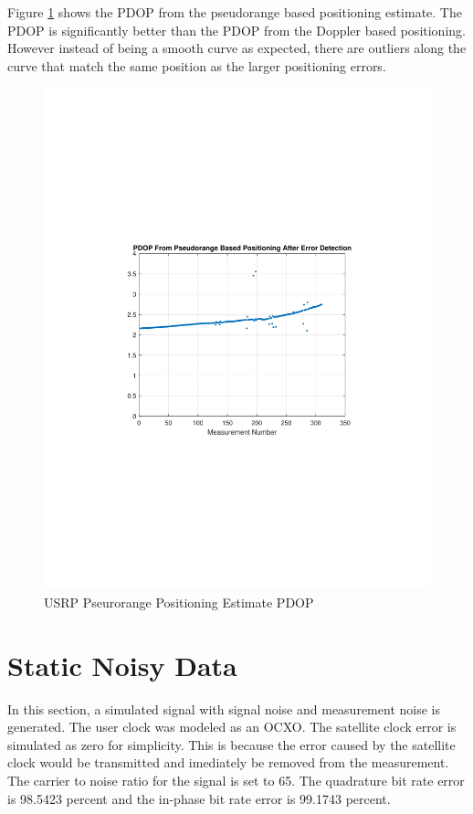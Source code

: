 \documentclass[12pt]{report}
\begin{document}
Figure \ref{fig:USRPpseudo15minIridPositpdop} shows the PDOP from the pseudorange based positioning estimate. The PDOP is significantly better than the PDOP from the Doppler based positioning. However instead of being a smooth curve as expected, there are outliers along the curve that match the same position as the larger positioning errors. 
\begin{figure}[h!]
    \centering
    \includegraphics[trim=1.2in 3.3in 1.75in 3.3in,clip,width=5in]
    {Irid_15min_USRP_PseudoPDOP.pdf}
    \caption{USRP Pseurorange Positioning Estimate PDOP}
    \label{fig:USRPpseudo15minIridPositpdop}
\end{figure}

\section{Static Noisy Data}
In this section, a simulated signal with signal noise and measurement noise is generated. The user clock was modeled as an OCXO. The satellite clock error is simulated as zero for simplicity. This is because the error caused by the satellite clock would be transmitted and imediately be removed from the measurement. The carrier to noise ratio for the signal is set to 65. The quadrature bit rate error is 98.5423 percent and the in-phase bit rate error is 99.1743 percent. 
\end{document}
